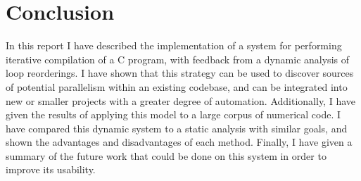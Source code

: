 \documentclass[journal]{IEEEtran}
\begin{document}
\section{Conclusion}

In this report I have described the implementation of a system for performing
iterative compilation of a C program, with feedback from a dynamic analysis of
loop reorderings. I have shown that this strategy can be used to discover
sources of potential parallelism within an existing codebase, and can be
integrated into new or smaller projects with a greater degree of automation.
Additionally, I have given the results of applying this model to a large corpus
of numerical code. I have compared this dynamic system to a static analysis with
similar goals, and shown the advantages and disadvantages of each method.
Finally, I have given a summary of the future work that could be done on this
system in order to improve its usability.

\ifCLASSOPTIONcaptionsoff
  \newpage
\fi

\printbibliography
\end{document}
